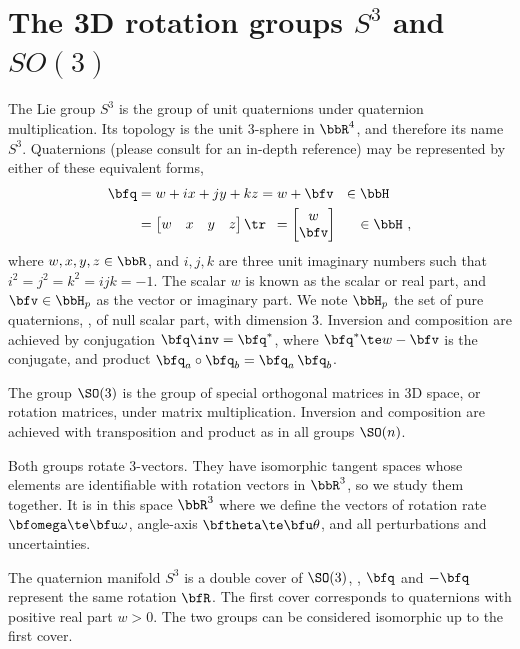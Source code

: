 
\section{The 3D rotation groups $S^3$ and $SO(3)$}
\label{sec:S3_SO3}

The Lie group $S^3$ is the group of unit quaternions under quaternion multiplication. 
Its topology is the unit 3-sphere in $\bbR^4$, and therefore its name $S^3$.
Quaternions (please consult \cite{SOLA-17-Quaternion} for an in-depth reference) may be represented by either of these equivalent forms,
%
\begin{align}
\begin{split}		
\bfq 
&= w+ix+jy+kz
=w+\bfv ~~ \in\bbH
\\
&
=\begin{bmatrix}w&x&y&z\end{bmatrix}\tr 
~\,=\begin{bmatrix}w\\\bfv\end{bmatrix} \quad~\, \in\bbH
~,
\end{split}
\end{align}
%
where $w,x,y,z\in\bbR$, and $i,j,k$ are three unit imaginary numbers such that $i^2=j^2=k^2=ijk=-1$.
The scalar $w$ is known as the scalar or real part, and $\bfv\in\bbH_p$ as the vector or imaginary part.
We note $\bbH_p$ the set of pure quaternions, \ie, of null scalar part, with dimension 3.
Inversion and composition are achieved by conjugation $\bfq\inv = \bfq^*$, where $\bfq^*\te w-\bfv$ is the conjugate, and product $\bfq_a\circ\bfq_b = \bfq_a\,\bfq_b$.

The group $\SO(3)$ is the group of special orthogonal matrices in 3D space, or rotation matrices, under matrix multiplication.
Inversion and composition are achieved with transposition and product as in all groups $\SO(n)$.

Both groups rotate 3-vectors. 
They have isomorphic tangent spaces whose elements are identifiable with rotation vectors in $\bbR^3$, so we study them together.
It is in this space $\bbR^3$ where we define the vectors of rotation rate $\bw\te\bfu\omega$, angle-axis $\bth\te\bfu\theta$, and all perturbations and uncertainties.

The quaternion manifold $S^3$ is a double cover of $\SO(3)$, \ie, $\bfq$ and $-\bfq$ represent the same rotation $\bfR$. 
The first cover corresponds to quaternions with positive real part $w>0$.
The two groups can be considered isomorphic up to the first cover. 




